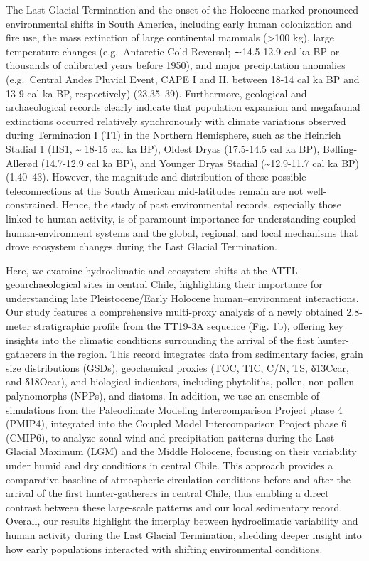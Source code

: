 \documentclass[
]{article}
\begin{document}
The Last Glacial Termination and the onset of the Holocene marked
pronounced environmental shifts in South America, including early human
colonization and fire use, the mass extinction of large continental
mammals (\textgreater100 kg), large temperature changes (e.g.~Antarctic
Cold Reversal; ∼14.5-12.9 cal ka BP or thousands of calibrated years
before 1950), and major precipitation anomalies (e.g.~Central Andes
Pluvial Event, CAPE I and II, between 18-14 cal ka BP and 13-9 cal ka
BP, respectively) (23,35--39). Furthermore, geological and
archaeological records clearly indicate that population expansion and
megafaunal extinctions occurred relatively synchronously with climate
variations observed during Termination I (T1) in the Northern
Hemisphere, such as the Heinrich Stadial 1 (HS1, \textasciitilde{} 18-15
cal ka BP), Oldest Dryas (17.5-14.5 cal ka BP), Bølling-Allerød
(14.7-12.9 cal ka BP), and Younger Dryas Stadial
(\textasciitilde12.9-11.7 cal ka BP) (1,40--43). However, the magnitude
and distribution of these possible teleconnections at the South American
mid-latitudes remain are not well-constrained. Hence, the study of past
environmental records, especially those linked to human activity, is of
paramount importance for understanding coupled human-environment systems
and the global, regional, and local mechanisms that drove ecosystem
changes during the Last Glacial Termination.

Here, we examine hydroclimatic and ecosystem shifts at the ATTL
geoarchaeological sites in central Chile, highlighting their importance
for understanding late Pleistocene/Early Holocene human--environment
interactions. Our study features a comprehensive multi-proxy analysis of
a newly obtained 2.8-meter stratigraphic profile from the TT19-3A
sequence (Fig. 1b), offering key insights into the climatic conditions
surrounding the arrival of the first hunter-gatherers in the region.
This record integrates data from sedimentary facies, grain size
distributions (GSDs), geochemical proxies (TOC, TIC, C/N, TS, δ13Ccar,
and δ18Ocar), and biological indicators, including phytoliths, pollen,
non-pollen palynomorphs (NPPs), and diatoms. In addition, we use an
ensemble of simulations from the Paleoclimate Modeling Intercomparison
Project phase 4 (PMIP4), integrated into the Coupled Model
Intercomparison Project phase 6 (CMIP6), to analyze zonal wind and
precipitation patterns during the Last Glacial Maximum (LGM) and the
Middle Holocene, focusing on their variability under humid and dry
conditions in central Chile. This approach provides a comparative
baseline of atmospheric circulation conditions before and after the
arrival of the first hunter-gatherers in central Chile, thus enabling a
direct contrast between these large-scale patterns and our local
sedimentary record. Overall, our results highlight the interplay between
hydroclimatic variability and human activity during the Last Glacial
Termination, shedding deeper insight into how early populations
interacted with shifting environmental conditions.
\end{document}
